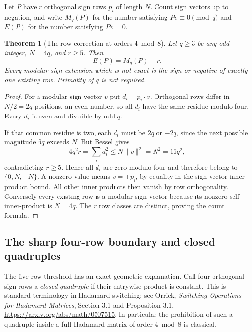 \documentclass[11pt]{article}
\newtheorem{theorem}{Theorem}[section]
\begin{document}
Let $P$ have $r$ orthogonal sign rows $p_i$ of length $N$. Count sign
vectors up to negation, and write $M_q(P)$ for the number satisfying
$Pv\equiv0\pmod q$ and $E(P)$ for the number satisfying $Pv=0$.

\begin{theorem}[The row correction at orders $4\bmod8$]
Let $q\ge3$ be any odd integer, $N=4q$, and $r\ge5$. Then
\[
 \boxed{E(P)=M_q(P)-r.}
\]
Every modular sign extension which is not exact is the sign or
negative of exactly one existing row. Primality of $q$ is not required.
\end{theorem}
\begin{proof}
For a modular sign vector $v$ put $d_i=p_i\cdot v$.
Orthogonal rows differ in $N/2=2q$ positions, an even number, so
all $d_i$ have the same residue modulo four. Every $d_i$ is even
and divisible by odd $q$.

If that common residue is two, each $d_i$ must be $2q$ or $-2q$,
since the next possible magnitude $6q$ exceeds $N$. But Bessel gives
\[
 4q^2r=\sum_i d_i^2\le N\|v\|^2=N^2=16q^2,
\]
contradicting $r\ge5$. Hence all $d_i$ are zero modulo four and
therefore belong to $\{0,N,-N\}$. A nonzero value means
$v=\pm p_i$, by equality in the sign-vector inner product bound.
All other inner products then vanish by row orthogonality.
Conversely every existing row is a modular sign vector because its
nonzero self-inner-product is $N=4q$. The $r$ row classes are distinct,
proving the count formula.
\end{proof}

\subsection{The sharp four-row boundary and closed quadruples}
The five-row threshold has an exact geometric explanation. Call four
orthogonal sign rows a \emph{closed quadruple} if their entrywise
product is constant. This is standard terminology in Hadamard
switching; see Orrick, \emph{Switching Operations for Hadamard
Matrices}, Section 3.1 and Proposition 3.1,
\url{https://arxiv.org/abs/math/0507515}.
In particular the prohibition of such a quadruple inside a full
Hadamard matrix of order $4\bmod8$ is classical.
\end{document}
